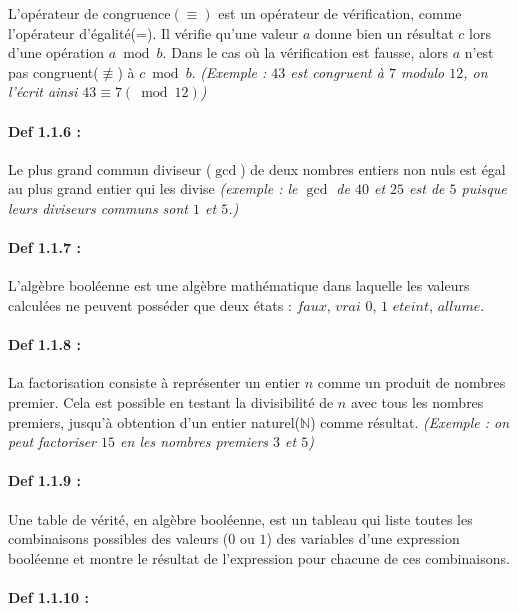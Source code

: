 \documentclass{article}
\begin{document}
L'opérateur de \(\text{congruence}(\equiv)\) est un opérateur de
vérification, comme l'opérateur d'égalité(=). Il vérifie
qu'une valeur \(a\) donne bien un résultat \(c\) lors d'une opération
\(a \bmod b\). Dans le cas où la vérification est fausse, alors \(a\)
n'est pas congruent(\(\not\equiv\)) à \(c \bmod b\). \textit{(Exemple : $43$ est congruent à $7$ modulo $12$, on l'écrit ainsi $43 \equiv 7 (\bmod 12)$)}

\paragraph{Def 1.1.6 :}\label{def-1.1.6}

Le plus grand commun diviseur ($\gcd$) de deux nombres entiers non nuls
est égal au plus grand entier qui les divise \textit{(exemple : le $\gcd$
	de \(40\) et \(25\) est de \(5\) puisque leurs diviseurs communs sont
	\(1\) et \(5\).)}

\paragraph{Def 1.1.7 :}\label{def-1.1.7}

L'algèbre booléenne est une algèbre mathématique dans laquelle les valeurs calculées
ne peuvent posséder que deux états : \(faux\), \(vrai\) \textbar{}
\(0\), \(1\) \textbar{} \(eteint\), \(allume\).

\paragraph{Def 1.1.8 :}\label{def-1.1.8}

La factorisation consiste à représenter un entier \(n\) comme un produit
de nombres premier. Cela est possible en testant la divisibilité de
\(n\) avec tous les nombres premiers, jusqu'à obtention d'un entier naturel($\mathbb{N}$) comme résultat. \textit{(Exemple : on peut factoriser $15$ en les nombres premiers $3$ et $5$)}

\paragraph{Def 1.1.9 :}\label{def-1.1.9}

Une table de vérité, en algèbre booléenne, est un tableau qui liste
toutes les combinaisons possibles des valeurs (\(0\) ou \(1\)) des
variables d'une expression booléenne et montre le résultat de
l'expression pour chacune de ces combinaisons.

\paragraph{Def 1.1.10 :}\label{def-1.1.10}
\end{document}
